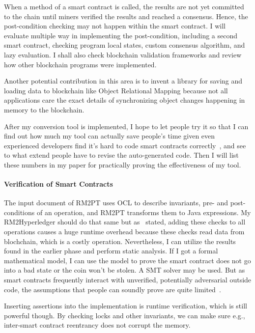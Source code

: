 When a method of a smart contract is called, the results are not yet committed to the chain until miners verified the results and reached a consensus. Hence, the post-condition checking may not happen within the smart contract. I will evaluate multiple way in implementing the post-condition, including a second smart contract, checking program local states, custom consensus algorithm, and lazy evaluation.
I shall also check blockchain validation frameworks and review how other blockchain programs were implemented.

Another potential contribution in this area is to invent a library for saving and loading data to blockchain like Object Relational Mapping because
not all applications care the exact details of synchronizing object changes happening in memory to the blockchain.

After my conversion tool is implemented, I hope to let people try it so that I can find out how much my tool can actually save people's time given even experienced developers find it's hard to code smart contracts correctly~\cite{dao2019challenges}, and see to what extend people have to revise the auto-generated code. Then I will list these numbers in my paper for practically proving the effectiveness of my tool.



\paragraph*{Verification of Smart Contracts}
The input document of RM2PT uses OCL to describe invariants, pre- and post-conditions of an operation, and RM2PT transforms them to Java expressions.
My RM2Hyperledger should do that same but as~\cite{li2020securing} stated, adding these checks to all operations causes a huge runtime overhead because these checks read data from blochchain, which is a costly operation.
Nevertheless, I can utilize the results found in the earlier phase and perform static analysis.
If I got a formal mathematical model, I can use the model to prove the smart contract does not go into a bad state or the coin won't be stolen.
A SMT solver may be used.
But as smart contracts frequently interact with unverified, potentially adversarial outside code,
the assumptions that people can soundly prove are quite limited~\cite{bram2021rich}.

Inserting assertions into the implementation is runtime verification, which is still powerful though.
By checking locks and other invariants, we can make sure e.g., inter-smart contract reentrancy does not corrupt the memory.


